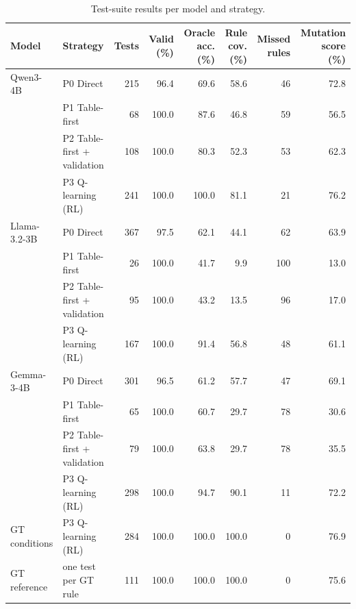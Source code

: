 \begin{table}[t]
\centering
\caption{Test-suite results per model and strategy.}
\label{tab:main}
\footnotesize
\setlength{\tabcolsep}{3pt}
\begin{tabular}{@{}llrrrrrr@{}}
\toprule
Model & Strategy & Tests & Valid (\%) & Oracle acc. (\%) & Rule cov. (\%) & Missed rules & Mutation score (\%) \\
\midrule
Qwen3-4B & P0 Direct & 215 & 96.4 & 69.6 & 58.6 & 46 & 72.8 \\
 & P1 Table-first & 68 & 100.0 & 87.6 & 46.8 & 59 & 56.5 \\
 & P2 Table-first + validation & 108 & 100.0 & 80.3 & 52.3 & 53 & 62.3 \\
 & P3 Q-learning (RL) & 241 & 100.0 & 100.0 & 81.1 & 21 & 76.2 \\
\addlinespace
Llama-3.2-3B & P0 Direct & 367 & 97.5 & 62.1 & 44.1 & 62 & 63.9 \\
 & P1 Table-first & 26 & 100.0 & 41.7 & 9.9 & 100 & 13.0 \\
 & P2 Table-first + validation & 95 & 100.0 & 43.2 & 13.5 & 96 & 17.0 \\
 & P3 Q-learning (RL) & 167 & 100.0 & 91.4 & 56.8 & 48 & 61.1 \\
\addlinespace
Gemma-3-4B & P0 Direct & 301 & 96.5 & 61.2 & 57.7 & 47 & 69.1 \\
 & P1 Table-first & 65 & 100.0 & 60.7 & 29.7 & 78 & 30.6 \\
 & P2 Table-first + validation & 79 & 100.0 & 63.8 & 29.7 & 78 & 35.5 \\
 & P3 Q-learning (RL) & 298 & 100.0 & 94.7 & 90.1 & 11 & 72.2 \\
\addlinespace
GT conditions & P3 Q-learning (RL) & 284 & 100.0 & 100.0 & 100.0 & 0 & 76.9 \\
GT reference & one test per GT rule & 111 & 100.0 & 100.0 & 100.0 & 0 & 75.6 \\
\bottomrule
\end{tabular}
\end{table}
